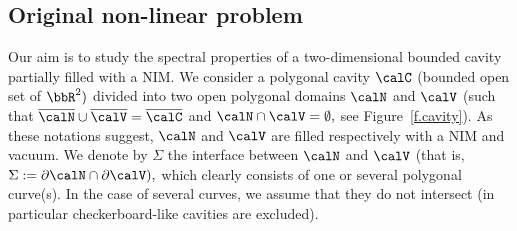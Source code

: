 \subsection{Original non-linear problem}\label{s-nonlinear}
Our aim is to study the spectral properties of a two-dimensional bounded cavity partially filled with a NIM. We consider a polygonal cavity $\calC$ (bounded open set of $\bbR^2)$ divided into two open polygonal domains $\calN$ and $\calV$ (such that $\overline{\calN} \cup \overline{\calV} = \overline{\calC}$ and $\calN \cap \calV = \emptyset,$ see Figure~\ref{f.cavity}). As these notations suggest, $\calN$ and $\calV$ are filled respectively with a NIM and vacuum. We denote by $\Sigma$ the interface between $\calN$ and $\calV$ (that is, $\Sigma := \partial\calN \cap \partial\calV),$ which clearly consists of one or several polygonal curve(s). In the case of several curves, we assume that they do not intersect (in particular checkerboard-like cavities are excluded).
